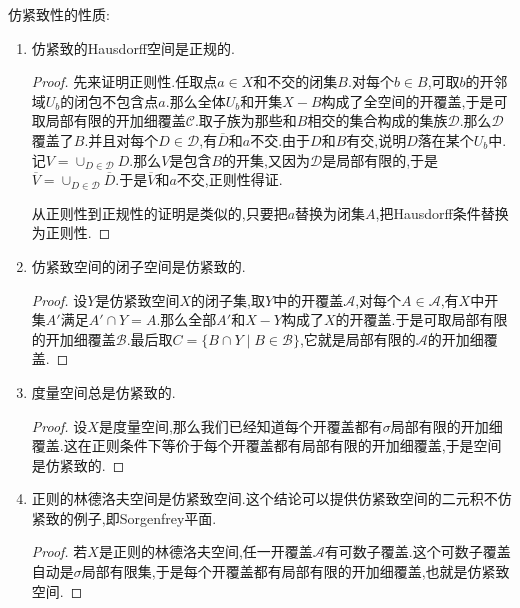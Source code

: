 仿紧致性的性质:
\begin{enumerate}
	\item 仿紧致的Hausdorff空间是正规的.
	\begin{proof}
		
		先来证明正则性.任取点$a\in X$和不交的闭集$B$.对每个$b\in B$,可取$b$的开邻域$U_b$的闭包不包含点$a$.那么全体$U_b$和开集$X-B$构成了全空间的开覆盖,于是可取局部有限的开加细覆盖$\mathscr{C}$.取子族为那些和$B$相交的集合构成的集族$\mathscr{D}$.那么$\mathscr{D}$覆盖了$B$.并且对每个$D\in\mathscr{D}$,有$\overline{D}$和$a$不交.由于$D$和$B$有交,说明$D$落在某个$U_b$中.记$V=\cup_{D\in\mathscr{D}}D$.那么$V$是包含$B$的开集,又因为$\mathscr{D}$是局部有限的,于是$\overline{V}=\cup_{D\in\mathscr{D}}\overline{D}$.于是$\overline{V}$和$a$不交,正则性得证.
		
		从正则性到正规性的证明是类似的,只要把$a$替换为闭集$A$,把Hausdorff条件替换为正则性.
	\end{proof}
	\item 仿紧致空间的闭子空间是仿紧致的.
	\begin{proof}
		
		设$Y$是仿紧致空间$X$的闭子集,取$Y$中的开覆盖$\mathscr{A}$,对每个$A\in\mathscr{A}$,有$X$中开集$A'$满足$A'\cap Y=A$.那么全部$A'$和$X-Y$构成了$X$的开覆盖.于是可取局部有限的开加细覆盖$\mathscr{B}$.最后取$C=\{B\cap Y\mid B\in\mathscr{B}\}$,它就是局部有限的$\mathscr{A}$的开加细覆盖.
	\end{proof}
	\item 度量空间总是仿紧致的.
	\begin{proof}
		
		设$X$是度量空间,那么我们已经知道每个开覆盖都有$\sigma$局部有限的开加细覆盖.这在正则条件下等价于每个开覆盖都有局部有限的开加细覆盖,于是空间是仿紧致的.
	\end{proof}
	\item 正则的林德洛夫空间是仿紧致空间.这个结论可以提供仿紧致空间的二元积不仿紧致的例子,即Sorgenfrey平面.
	\begin{proof}
		
		若$X$是正则的林德洛夫空间,任一开覆盖$\mathscr{A}$有可数子覆盖.这个可数子覆盖自动是$\sigma$局部有限集,于是每个开覆盖都有局部有限的开加细覆盖,也就是仿紧致空间.
	\end{proof}
\end{enumerate}

